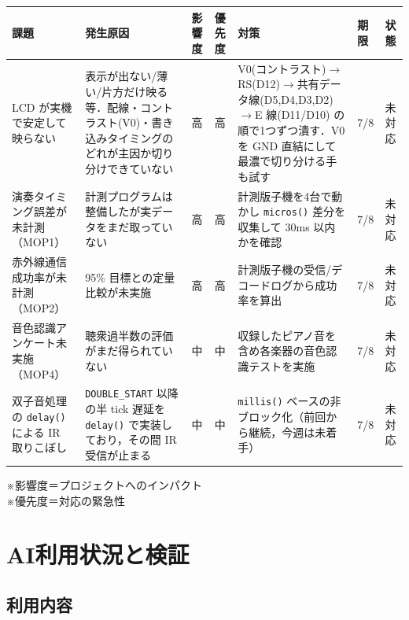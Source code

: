 \documentclass[a4paper,11pt]{ltjsarticle}
\providecommand{\％}{\%}
\begin{document}
\begingroup
\setlength{\tabcolsep}{3pt}
\sloppy
{\footnotesize
\begin{longtable}{|p{2.6cm}|p{3.2cm}|p{0.9cm}|p{0.9cm}|p{3.4cm}|p{1.3cm}|p{1.3cm}|}
\hline
\rowcolor[gray]{0.9}
課題 & 発生原因 & 影響度 & 優先度 & 対策 & 期限 & 状態 \\
\hline
LCD が実機で安定して映らない & 表示が出ない/薄い/片方だけ映る等．配線・コントラスト(V0)・書き込みタイミングのどれが主因か切り分けできていない & 高 & 高 & V0(コントラスト)$\to$RS(D12)$\to$共有データ線(D5,D4,D3,D2)$\to$E 線(D11/D10) の順で1つずつ潰す．V0 を GND 直結にして最濃で切り分ける手も試す & 7/8 & 未対応 \\
\hline
演奏タイミング誤差が未計測（MOP1） & 計測プログラムは整備したが実データをまだ取っていない & 高 & 高 & 計測版子機を4台で動かし \texttt{micros()} 差分を収集して 30ms 以内かを確認 & 7/8 & 未対応 \\
\hline
赤外線通信成功率が未計測（MOP2） & 95\% 目標との定量比較が未実施 & 高 & 高 & 計測版子機の受信/デコードログから成功率を算出 & 7/8 & 未対応 \\
\hline
音色認識アンケート未実施（MOP4） & 聴衆過半数の評価がまだ得られていない & 中 & 中 & 収録したピアノ音を含め各楽器の音色認識テストを実施 & 7/8 & 未対応 \\
\hline
双子音処理の \texttt{delay()} による IR 取りこぼし & \texttt{DOUBLE\_\-START} 以降の半 tick 遅延を \texttt{delay()} で実装しており，その間 IR 受信が止まる & 中 & 中 & \texttt{millis()} ベースの非ブロック化（前回から継続，今週は未着手） & 7/8 & 未対応 \\
\hline
\end{longtable}
}
\endgroup

\vspace{0.5em}
※影響度＝プロジェクトへのインパクト\\
※優先度＝対応の緊急性

\section{AI利用状況と検証}\label{sec:ai}

\subsection{利用内容}\label{sec:ai-use}
\end{document}
